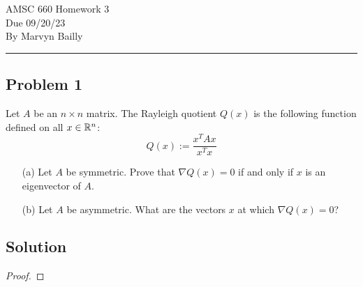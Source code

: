 \documentclass[12pt]{report}
\begin{document}
\large
\begin{center}
AMSC 660 Homework 3\\
Due 09/20/23\\
By Marvyn Bailly\\
\end{center}
\normalsize
\hrule



\begin{problem}%
\subsection*{Problem 1}

Let $A$ be an $n \times n$ matrix. The Rayleigh quotient $Q(x)$ is the following function defined on all $x \in {\mathbb R}^n$:
\[
     Q(x) := \frac{x^T A x}{x^T x}
\]
\begin{enumerate}
    \item [(a)] Let $A$ be symmetric. Prove that $\nabla Q(x) = 0$ if and only if $x$ is an eigenvector of $A$.
    \item [(b)] Let $A$ be asymmetric. What are the vectors $x$ at which $\nabla Q(x) = 0$?
\end{enumerate}

\subsection*{Solution}
\begin{proof}


\end{proof}
\end{problem}
\end{document}
